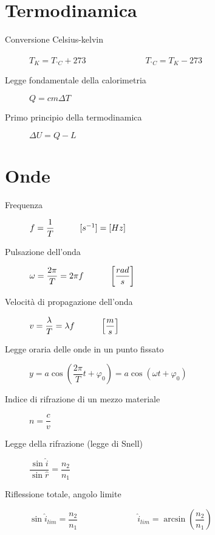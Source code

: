 \documentclass[a4paper,11pt,italian]{article}
\begin{document}
\section{Termodinamica}
\begin{description}
  \item[Conversione Celsius-kelvin] $ T_K = T_{^{\circ}C} + 273 $~~~~~~~~~~~~~~$ T_{^{\circ}C} = T_{K} - 273 $
  
  \item[Legge fondamentale della calorimetria] $ Q = cm \Delta T $
    
  \item[Primo principio della termodinamica] 
  $ \Delta U = Q - L $
\end{description}
   
\section{Onde}
\begin{description}
  
  \item[Frequenza] 
$ f = \dfrac{1}{T} \hspace*{3em} [s^{-1}]=[ Hz] $
  
  \item[Pulsazione dell'onda] $ \omega = \dfrac{2\pi}{T} = 2\pi f \hspace*{3em} \left[ \dfrac{rad}{s} \right] $
  
  
  \item[Velocità di propagazione dell'onda] $ v = \dfrac{\lambda}{T} = \lambda f \hspace*{3em} \left[ \dfrac{m}{s} \right] $
  
  \item[Legge oraria delle onde in un punto fissato] $ y = a \cos\left(\dfrac{2 \pi}{T}t + \varphi_0\right) = a \cos\left(\omega t + \varphi_0\right) $

  \item[Indice di rifrazione di un mezzo materiale] $ n = \dfrac{c}{v} $
  
  \item[Legge della rifrazione (legge di Snell)] $ \dfrac{\sin \hat{i} }{\sin \hat{r}} = \dfrac{n_2}{n_1} $
  
  \item[Riflessione totale, angolo limite] $ \sin \hat{i}_{lim} = \dfrac{n_2}{n_1} $~~~~~~~~~~~~~~$ \hat{i}_{lim} = \arcsin \left( \dfrac{n_2}{n_1} \right) $  
\end{description}
   
\end{document}
